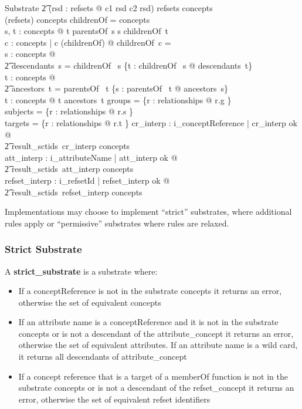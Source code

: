 \documentclass{article}
\begin{document}
\begin{schema}{Substrate}
\t2 (\forall rsd : \ran refsets @ c1 \in rsd \iff c2 \in rsd)
\also
   \dom refsets \subseteq concepts \\
   \bigcup (\ran refsets) \subseteq concepts
\also
    \dom childrenOf = concepts \\
    \forall s, t : concepts @ t \in parentsOf~s \iff s \in childrenOf~t  \\
    \forall c : concepts | c \notin \bigcup (\ran childrenOf) @ childrenOf~c = \emptyset \\
    \forall s : concepts @ \\
\t2 descendants~s = childrenOf~ s \cup \bigcup \{t : childrenOf~ s @ descendants~t\} \\
   \forall t : concepts @ \\
\t2 ancestors~t = parentsOf~ t \cup \bigcup \{s : parentsOf~ t @ ancestors~s\} \\
   \forall t : concepts @ t \notin ancestors~t
\also
   groups = \{r : relationships @ r.g \} \\
   subjects = \{r : relationships @ r.s \} \\
   targets = \{r : relationships @ r.t \}
\also
   \forall cr\_interp : \ran i\_conceptReference | cr\_interp \in \ran ok @ \\
\t2 result\_sctids~cr\_interp \subseteq concepts \\
   \forall att\_interp : \ran i\_attributeName | att\_interp \in \ran ok @ \\
\t2 result\_sctids~att\_interp \subseteq concepts \\
   \forall refset\_interp : \ran i\_refsetId | refset\_interp \in \ran ok @ \\
\t2 result\_sctids~refset\_interp \subseteq concepts 
\end{schema}

Implementations may choose to implement ``strict'' substrates, where additional rules apply or ``permissive'' substrates where rules are relaxed.
\subsubsection{Strict Substrate}
A \textbf{strict\_substrate} is a substrate where:
\begin{itemize}[noitemsep,nolistsep]
\item If a conceptReference is not in the substrate concepts it returns an error, otherwise the set of equivalent concepts
\item If an attribute name is a conceptReference and it is not in the substrate concepts or is not a descendant of the attribute\_concept it returns an error, otherwise the set of equivalent attributes.  If an
attribute name is a wild card, it returns all descendants of attribute\_concept
\item If a concept reference that is a target of a memberOf function is not in the substrate concepts or is not a descendant of the refset\_concept it returns an error, otherwise the set of equivalent refset identifiers
\end{itemize}
\end{document}
